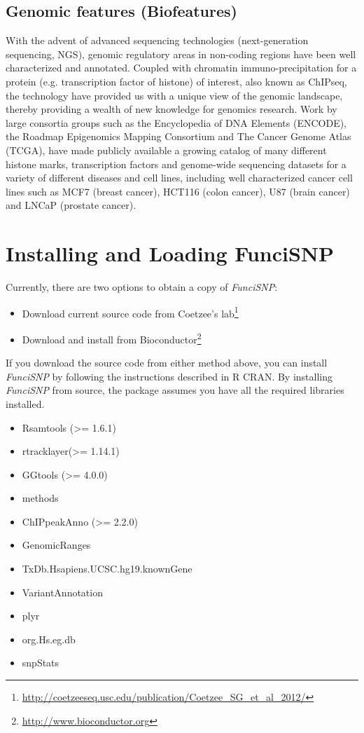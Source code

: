 \documentclass[12pt,fullpage]{article}
\newcommand{\Rpackage}[1]{{\textit{#1}}}
\begin{document}
\subsection{Genomic features (Biofeatures)}
With the advent of advanced sequencing technologies (next-generation sequencing,
        NGS), genomic regulatory areas in non-coding regions have been well
characterized and annotated. Coupled with chromatin immuno-precipitation for a
protein (e.g. transcription factor of histone) of interest, also known as
ChIPseq, the technology have provided us with a unique view of the genomic
landscape, thereby providing a wealth of new knowledge for genomics
research. Work by large consortia groups such as the Encyclopedia of DNA Elements
(ENCODE), the Roadmap Epigenomics Mapping Consortium and The Cancer
Genome Atlas (TCGA), have made publicly available a growing catalog of many
different histone marks, transcription factors and genome-wide sequencing
datasets for a variety of different diseases and cell lines, including well
characterized cancer cell lines such as MCF7 (breast cancer), HCT116 (colon
        cancer), U87 (brain cancer) and LNCaP (prostate cancer). 

\section{Installing and Loading FunciSNP}

Currently, there are two options to obtain a copy of \Rpackage{FunciSNP}: 

\begin{itemize}
\item Download current source code from Coetzee's
lab\footnote{\url{http://coetzeeseq.usc.edu/publication/Coetzee_SG_et_al_2012/}}
\item Download and install from
Bioconductor\footnote{\url{http://www.bioconductor.org}}
\end{itemize}

If you download the source code from either method above, you can install
\Rpackage{FunciSNP} by following the instructions described in R CRAN. By
installing \Rpackage{FunciSNP} from source, the package assumes you have all the
required libraries installed.

\begin{itemize}
\item Rsamtools (>= 1.6.1)
\item rtracklayer(>= 1.14.1)
\item GGtools (>= 4.0.0)
\item methods
\item ChIPpeakAnno (>= 2.2.0)
\item GenomicRanges
\item TxDb.Hsapiens.UCSC.hg19.knownGene
\item VariantAnnotation
\item plyr
\item org.Hs.eg.db
\item snpStats
\end{itemize}
\end{document}
